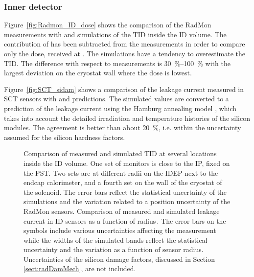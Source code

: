 \documentclass[cernpreprint, atlasdraft=false, UKenglish,british,orcidlogo, texmf, orcidlogo]{atlasdoc}
\begin{document}
\subsubsection{Inner detector}
 
Figure~\ref{fig:Radmon_ID_dose} shows the comparison of the RadMon measurements  with \fluka and 
simulations of the \gls{TID} inside the \gls{ID} volume. The contribution of \RunOne has been
subtracted from the measurements in order to compare only the \RunTwo dose, received at .
The simulations have a tendency to overestimate the \gls{TID}. The difference with respect to measurements is
\SIrange{30}{100}{\percent} with the largest deviation on the cryostat wall where the dose is lowest.
 
Figure~\ref{fig:SCT_sidam} shows a comparison of the leakage current measured in \gls{SCT} sensors with \fluka
and  predictions.
The simulated \phieqv values are converted to a prediction of the leakage current using the Hamburg annealing model
\cite{hamburgmodel}, which takes into account the detailed irradiation and temperature histories of the silicon
modules. The agreement is better than about \SI{20}{\percent}, i.e. within the uncertainty assumed for the silicon hardness
factors.
 
\begin{figure}
\begin{center}
 
\end{center}
\caption{\protect{} Comparison of measured and simulated \gls{TID} at several
locations inside the \gls{ID} volume. One set of monitors is close to the \gls{IP}, fixed on the \gls{PST}.
Two sets are at different radii on the \gls{IDEP} next to the endcap calorimeter, and a fourth set on the
wall of the cryostat of the solenoid. The error bars reflect the statistical uncertainty of the simulations and
the variation related to a position uncertainty of the RadMon sensors.
\protect{} Comparison of measured and simulated leakage current in \gls{ID} sensors as a function of radius\,\protect\cite{IDET-2020-01}.
The error bars on the symbols include various uncertainties affecting the measurement while the widths of the simulated bands
reflect the statistical uncertainty and the variation as a function of sensor radius. Uncertainties of the silicon damage
factors, discussed in Section\,\ref{sect:radDamMech}, are not included.
\label{fig:damageComparisonID}
}
\end{figure}
 
\end{document}
